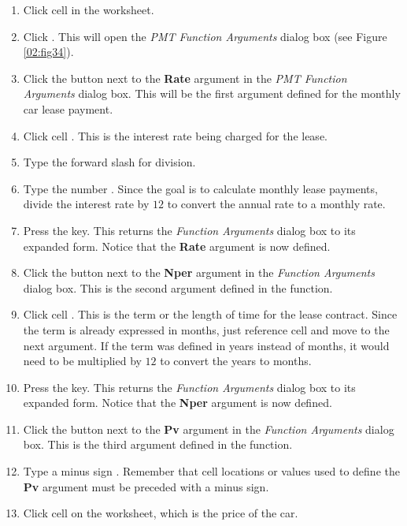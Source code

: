 \begin{enumerate}
	\item Click cell  in the  worksheet.
	\item Click . This will open the \textit{PMT Function Arguments} dialog box (see Figure \ref{02:fig34}).
	\item Click the  button next to the \textbf{Rate} argument in the \textit{PMT Function Arguments} dialog box. This will be the first argument defined for the monthly car lease payment.
	\item Click cell . This is the interest rate being charged for the lease.
	\item Type the forward slash \fmtTyping{/} for division.
	\item Type the number . Since the goal is to calculate monthly lease payments, divide the interest rate by $ 12 $ to convert the annual rate to a monthly rate.
	\item Press the  key. This returns the \textit{Function Arguments} dialog box to its expanded form. Notice that the \textbf{Rate} argument is now defined.
	\item Click the  button next to the \textbf{Nper} argument in the \textit{Function Arguments} dialog box. This is the second argument defined in the function.
	\item Click cell . This is the term or the length of time for the lease contract. Since the term is already expressed in months, just reference cell  and move to the next argument. If the term was defined in years instead of months, it would need to be multiplied by $ 12 $ to convert the years to months.
	\item Press the  key. This returns the \textit{Function Arguments} dialog box to its expanded form. Notice that the \textbf{Nper} argument is now defined.
	\item Click the  button next to the \textbf{Pv} argument in the \textit{Function Arguments} dialog box. This is the third argument defined in the function.
	\item Type a minus sign \fmtTyping{-}. Remember that cell locations or values used to define the \textbf{Pv} argument must be preceded with a minus sign.
	\item Click cell  on the worksheet, which is the price of the car.

\end{enumerate}
